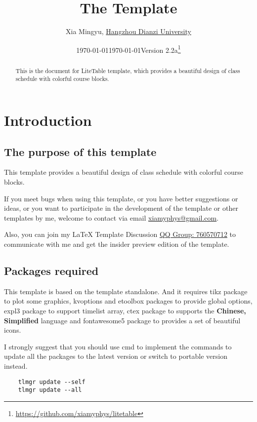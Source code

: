 \documentclass[11pt]{article}
\title{The \pkg{LiteTable} Template}
\author[1]{Xia Mingyu, \href{https://www.hdu.edu.cn}{Hangzhou Dianzi University}}
\date{\today}
\affil[1]{\href{mailto:xiamyphys@gmail.com}{\texttt{xiamyphys@gmail.com}}}
\date{\today\quad Version 2.2a\thanks{%
  \url{https://github.com/xiamyphys/litetable}}}
\def\pkg#1{\texorpdfstring{\textcolor{pkgcolor}{\textsf{#1}}}{“#1”}}
\def\cmd#1{\texorpdfstring{\textcolor{cmdcolor}{\textsf{#1}}}{“#1”}}
\begin{document}
\maketitle

\begin{abstract}
This is the document for \pkg{LiteTable} template, which provides a beautiful design of class schedule with colorful course blocks.

\end{abstract}

\tableofcontents

\section{Introduction}

\subsection{The purpose of this template}
This template provides a beautiful design of class schedule with colorful course blocks.

If you meet bugs when using this template, or you have better suggestions or ideas, or you want to participate in the development of the template or other templates by me, welcome to contact via email \href{mailto:xiamyphys@gmail.com}{xiamyphys@gmail.com}.

Also, you can join my \textsf\LaTeX{} Template Discussion \href{https://qm.qq.com/q/OnHzbNvVAG}{QQ Group: 760570712} to communicate with me and get the insider preview edition of the template.

\subsection{Packages required}
This template is based on the template \pkg{standalone}. And it requires \pkg{tikz} package to plot some graphics, \pkg{kvoptions} and \pkg{etoolbox} packages to provide global options, \pkg{expl3} package to support \cmd{timelist} array, \pkg{ctex} package to supports the \textbf{Chinese, Simplified} language and \pkg{fontawesome5} package to provides a set of beautiful icons.

I strongly suggest that you should use cmd to implement the commands to update all the packages to the latest version or switch to portable version instead.
\begin{verbatim}
    tlmgr update --self
    tlmgr update --all
\end{verbatim}
\end{document}

